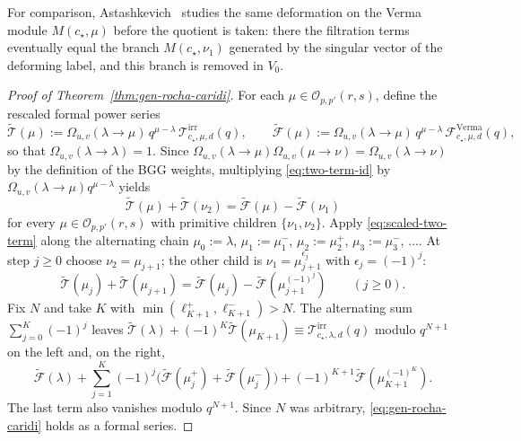 \documentclass[twoside,10pt]{article}
\numberwithin{equation}{section}
\theoremstyle{slbody}
\theoremstyle{definition}
\theoremstyle{remark}
\begin{document}
For comparison, Astashkevich~\cite[Theorem~C(e)]{Astashkevich1997} studies
the same deformation on the Verma module \(M(c_\star,\mu)\) before the
quotient is taken: there the filtration terms eventually equal the branch
\(M(c_\star,\nu_1)\) generated by the singular vector of the deforming label,
and this branch is removed in \(V_0\).

\begin{proof}[Proof of Theorem~\ref{thm:gen-rocha-caridi}]
For each \(\mu\in\mathcal{O}_{p,p'}(r,s)\), define the rescaled formal power
series
\[
 \widetilde{\mathcal{T}}(\mu)
 :=\Omega_{u,v}(\lambda\to\mu)\,q^{\mu-\lambda}\,
   \mathcal{T}^{\mathrm{irr}}_{c_\star,\mu,d}(q),
 \qquad
 \widetilde{\mathcal{F}}(\mu)
 :=\Omega_{u,v}(\lambda\to\mu)\,q^{\mu-\lambda}\,
   \mathcal{F}^{\mathrm{Verma}}_{c_\star,\mu,d}(q),
\]
so that \(\Omega_{u,v}(\lambda\to\lambda)=1\).  Since
\(\Omega_{u,v}(\lambda\to\mu)\Omega_{u,v}(\mu\to\nu)=\Omega_{u,v}(\lambda\to\nu)\)
by the definition of the BGG weights, multiplying \eqref{eq:two-term-id}
by \(\Omega_{u,v}(\lambda\to\mu)q^{\mu-\lambda}\) yields
\begin{equation}\label{eq:scaled-two-term}
 \widetilde{\mathcal{T}}(\mu)+\widetilde{\mathcal{T}}(\nu_2)
 =\widetilde{\mathcal{F}}(\mu)-\widetilde{\mathcal{F}}(\nu_1)
\end{equation}
for every \(\mu\in\mathcal{O}_{p,p'}(r,s)\) with primitive children
\(\{\nu_1,\nu_2\}\).  Apply \eqref{eq:scaled-two-term} along the alternating
chain \(\mu_0:=\lambda\), \(\mu_1:=\mu^-_1\), \(\mu_2:=\mu^+_2\),
\(\mu_3:=\mu^-_3\), \(\ldots\).  At step \(j\geq0\) choose
\(\nu_2=\mu_{j+1}\); the other child is \(\nu_1=\mu^{\epsilon_j}_{j+1}\) with
\(\epsilon_j=(-1)^j\):
\[
 \widetilde{\mathcal{T}}(\mu_j)+\widetilde{\mathcal{T}}(\mu_{j+1})
 =\widetilde{\mathcal{F}}(\mu_j)-\widetilde{\mathcal{F}}(\mu^{(-1)^j}_{j+1})
 \qquad (j\geq0).
\]
Fix \(N\) and take \(K\) with \(\min(\ell^+_{K+1},\ell^-_{K+1})>N\).  The
alternating sum \(\sum_{j=0}^K(-1)^j\) leaves
\(\widetilde{\mathcal{T}}(\lambda)+(-1)^K\widetilde{\mathcal{T}}(\mu_{K+1})\equiv
\mathcal{T}^{\mathrm{irr}}_{c_\star,\lambda,d}(q)\) modulo \(q^{N+1}\) on the left
and, on the right,
\[
 \widetilde{\mathcal{F}}(\lambda)
 +\sum_{j=1}^K(-1)^j\bigl(\widetilde{\mathcal{F}}(\mu^+_j)
                         +\widetilde{\mathcal{F}}(\mu^-_j)\bigr)
 +(-1)^{K+1}\widetilde{\mathcal{F}}(\mu^{(-1)^K}_{K+1}).
\]
The last term also vanishes modulo \(q^{N+1}\).  Since \(N\) was arbitrary,
\eqref{eq:gen-rocha-caridi} holds as a formal series.


\end{proof}
\end{document}
